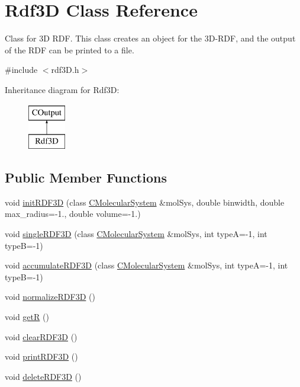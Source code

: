 \hypertarget{classRdf3D}{}\section{Rdf3D Class Reference}
\label{classRdf3D}


Class for 3D R\+DF. This class creates an object for the 3D-\/\+R\+DF, and the output of the R\+DF can be printed to a file.  




{\ttfamily \#include $<$rdf3\+D.\+h$>$}

Inheritance diagram for Rdf3D\+:\begin{figure}[H]
\begin{center}
\leavevmode
\includegraphics[height=2.000000cm]{classRdf3D}
\end{center}
\end{figure}
\subsection*{Public Member Functions}
\begin{DoxyCompactItemize}
\item 
void \mbox{\hyperlink{classRdf3D_aa86b927b22b369cd1d6ead93c17e43ee}{init\+R\+D\+F3D}} (class \mbox{\hyperlink{classCMolecularSystem}{C\+Molecular\+System}} \&mol\+Sys, double binwidth, double max\+\_\+radius=-\/1., double volume=-\/1.)
\item 
void \mbox{\hyperlink{classRdf3D_a27efc547d859576b41a16d98cd2d1df9}{single\+R\+D\+F3D}} (class \mbox{\hyperlink{classCMolecularSystem}{C\+Molecular\+System}} \&mol\+Sys, int typeA=-\/1, int typeB=-\/1)
\item 
void \mbox{\hyperlink{classRdf3D_aca3e0b2da042856d705b4bca8f6be335}{accumulate\+R\+D\+F3D}} (class \mbox{\hyperlink{classCMolecularSystem}{C\+Molecular\+System}} \&mol\+Sys, int typeA=-\/1, int typeB=-\/1)
\item 
void \mbox{\hyperlink{classRdf3D_a08d573ef51fd88bd42456a76fc3d7ca4}{normalize\+R\+D\+F3D}} ()
\item 
void \mbox{\hyperlink{classRdf3D_ade47a2d360bcc0112f0da45baef6e609}{getR}} ()
\item 
void \mbox{\hyperlink{classRdf3D_afff83789d5d90cd9cdbf9f7287cd785a}{clear\+R\+D\+F3D}} ()
\item 
void \mbox{\hyperlink{classRdf3D_a76fdc87564a586883c4f290fff3172b2}{print\+R\+D\+F3D}} ()
\item 
void \mbox{\hyperlink{classRdf3D_a6af1bf5b0301a6b43d9f0fffdb868c9c}{delete\+R\+D\+F3D}} ()
\end{DoxyCompactItemize}
